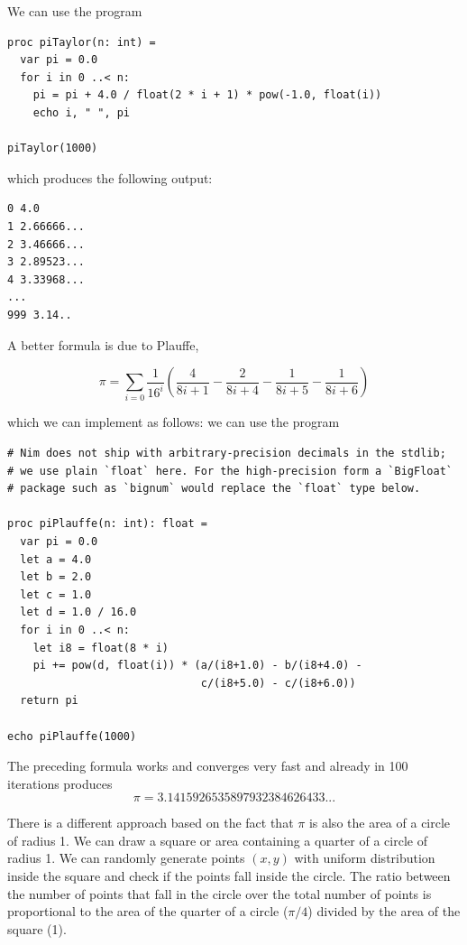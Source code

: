 \documentclass[justified, sixbynine]{tufte-book}
\theoremstyle{plain}%
\newtheorem * {corollary}{Corollary}
\theoremstyle{definition}
\theoremstyle{remark}
\newtheorem * {remark}{Remark}
\newtheorem * {note}{Note}
\begin{document}
\begin{fullwidth}
We can use the program
\begin{lstlisting}
proc piTaylor(n: int) =
  var pi = 0.0
  for i in 0 ..< n:
    pi = pi + 4.0 / float(2 * i + 1) * pow(-1.0, float(i))
    echo i, " ", pi

piTaylor(1000)
\end{lstlisting}

which produces the following output:
\begin{lstlisting}
0 4.0
1 2.66666...
2 3.46666...
3 2.89523...
4 3.33968...
...
999 3.14..
\end{lstlisting}

A better formula is due to Plauffe, 

\begin{equation}
\pi = \sum_{i=0} \frac{1}{16^i} \left(
\frac{4}{8i+1}-\frac{2}{8i+4}-\frac{1}{8i+5}-\frac{1}{8i+6}
\right)
\end{equation}

which we can implement as follows:
we can use the program
\begin{lstlisting}
# Nim does not ship with arbitrary-precision decimals in the stdlib;
# we use plain `float` here. For the high-precision form a `BigFloat`
# package such as `bignum` would replace the `float` type below.

proc piPlauffe(n: int): float =
  var pi = 0.0
  let a = 4.0
  let b = 2.0
  let c = 1.0
  let d = 1.0 / 16.0
  for i in 0 ..< n:
    let i8 = float(8 * i)
    pi += pow(d, float(i)) * (a/(i8+1.0) - b/(i8+4.0) -
                              c/(i8+5.0) - c/(i8+6.0))
  return pi

echo piPlauffe(1000)
\end{lstlisting}

The preceding formula works and converges very fast and already in 100 iterations produces
\begin{equation}
\pi = 3.1415926535897932384626433...
\end{equation}

There is a different approach based on the fact that $\pi$ is also the
area of a circle of radius 1. We can draw a square or area containing
a quarter of a circle of radius 1. We can randomly generate points $(x, y)$
with uniform distribution inside the square and check if the points fall inside
the circle. The ratio between the number of points that fall in
the circle over the total number of points is proportional to the area of
the quarter of a circle ($\pi /4$) divided by the area of the square (1).


\end{fullwidth}
\end{document}
